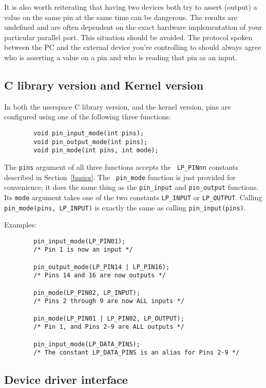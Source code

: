 \documentclass{article}
\begin{document}
It is also worth reiterating that having two devices both try to
assert (output) a value on the same pin at the same time can be
dangerous.  The results are undefined and are often dependent on the
exact hardware implementation of your particular parallel port.  This
situation should be avoided.  The protocol spoken between the PC and
the external device you're controlling to should always agree who is
asserting a value on a pin and who is reading that pin as an input.

\subsection{C library version and Kernel version}

In both the userspace C library version, and the kernel version, 
pins are configured using one of the following three functions:

\begin{verbatim}
        void pin_input_mode(int pins);
        void pin_output_mode(int pins);
        void pin_mode(int pins, int mode);
\end{verbatim}

The {\tt pins} argument of all three functions accepts the {\tt
LP\_PINnn} constants described in Section~\ref{basics}.  The {\tt
pin\_mode} function is just provided for convenience; it does the same
thing as the {\tt pin\_input} and {\tt pin\_output} functions.  Its
{\tt mode} argument takes one of the two constants {\tt LP\_INPUT} or
{\tt LP\_OUTPUT}.  Calling {\tt pin\_mode(pins, LP\_INPUT)} is exactly
the same as calling {\tt pin\_input(pins)}.

Examples:
\begin{verbatim}
        pin_input_mode(LP_PIN01);
        /* Pin 1 is now an input */

        pin_output_mode(LP_PIN14 | LP_PIN16);
        /* Pins 14 and 16 are now outputs */

        pin_mode(LP_PIN02, LP_INPUT);
        /* Pins 2 through 9 are now ALL inputs */

        pin_mode(LP_PIN01 | LP_PIN02, LP_OUTPUT);
        /* Pin 1, and Pins 2-9 are ALL outputs */

        pin_input_mode(LP_DATA_PINS);
        /* The constant LP_DATA_PINS is an alias for Pins 2-9 */
\end{verbatim}

\subsection{Device driver interface}
\end{document}
